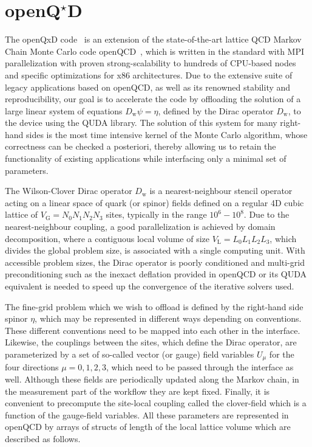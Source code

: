 \chapter{\texorpdfstring{openQ$^\star$D}{openQxD}}
\label{ch:p1:openqxd}

\newcommand{\Dw}{{D_{\mathrm{w}}}}

The openQxD code~\cite{openqxd} is an extension of the state-of-the-art
lattice QCD Markov Chain Monte Carlo code
openQCD~\cite{openqcd,Luscher:2012av}, which is written in the  standard
with MPI parallelization with proven strong-scalability to hundreds of
CPU-based nodes and specific optimizations for x86 architectures.
Due to the extensive suite of legacy applications based on openQCD, as well as
its renowned stability and reproducibility, our goal is to accelerate the code
by offloading the solution of a large linear system of equations
$\Dw\psi=\eta$, defined by the Dirac operator $\Dw$, to the
device using the QUDA library.
The solution of this system for many right-hand sides is the most time
intensive kernel of the Monte Carlo algorithm, whose correctness can be
checked a posteriori, thereby allowing us to retain the functionality of
existing applications while interfacing only a minimal set of parameters.

The Wilson-Clover Dirac operator $\Dw$ is a nearest-neighbour stencil operator
acting on a linear space of quark (or spinor) fields defined on a regular 4D
cubic lattice of $V_\mathrm{G}=N_0N_1N_2N_3$ sites, typically in the range $10^6-10^8$.
Due to the nearest-neighbour coupling, a good parallelization is achieved by
domain decomposition, where a contiguous local volume of size $V_\mathrm{L}=L_0L_1L_2L_3$,
which divides the global problem size, is associated with a single computing
unit.
With accessible problem sizes, the Dirac operator is poorly conditioned and
multi-grid preconditioning such as the inexact deflation \cite{Lüscher2007deflation} provided in openQCD
or its QUDA equivalent is needed to speed up the convergence of the iterative
solvers used.

The fine-grid problem which we wish to offload is defined by the right-hand
side spinor $\eta$, which may be represented in different ways depending on 
conventions. These different conventions need to be mapped into each other in the interface.
Likewise, the couplings between the sites, which define the Dirac operator, are
parameterized by a set of so-called vector (or gauge) field variables $U_\mu$
for the four directions $\mu=0,1,2,3$, which need to be passed through the interface as well.
Although these fields are periodically updated along the Markov chain, in
the measurement part of the workflow they are kept fixed.
Finally, it is convenient to precompute the site-local coupling called the
clover-field which is a function of the gauge-field variables.
All these parameters are represented in openQCD by arrays of structs of length of
the local lattice volume which are described as follows.

